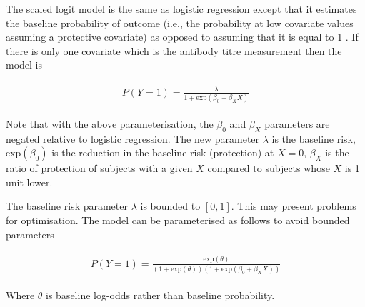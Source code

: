 The scaled logit model is the same as logistic regression except that it estimates the baseline probability of outcome (i.e., the probability at low covariate values assuming a protective covariate) as opposed to assuming that it is equal to 1 \cite{Dunning;2006}. If there is only one covariate which is the antibody titre measurement then the model is

\begin{align*}
    \begin{gathered}
        P(Y=1) = \frac{\lambda}{1 + \text{exp}(\beta_0 + \beta_X X)}
    \end{gathered}
\end{align*}

Note that with the above parameterisation, the $\beta_0$ and $\beta_X$ parameters are negated relative to logistic regression. The new parameter $\lambda$ is the baseline risk, $\text{exp}(\beta_0)$ is the reduction in the baseline risk (protection) at $X=0$, $\beta_X$ is the ratio of protection of subjects with a given $X$ compared to subjects whose $X$ is 1 unit lower.

The baseline risk parameter $\lambda$ is bounded to $[0, 1]$. This may present problems for optimisation. The model can be parameterised as follows to avoid bounded parameters

\begin{align*}
    \begin{gathered}
        P(Y=1) = \frac{\text{exp}(\theta)}{(1 + \text{exp}(\theta))(1 + \text{exp}(\beta_0 + \beta_X X))}
    \end{gathered}
\end{align*}

Where $\theta$ is baseline log-odds rather than baseline probability.
